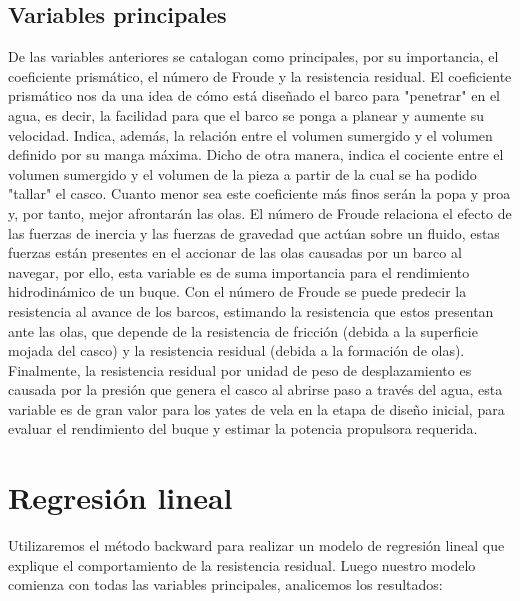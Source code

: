 \documentclass[twoside]{article}
\begin{document}
\begin{multicols}{2}
\subsection{Variables principales}
De las variables anteriores se catalogan como principales, por su importancia, el coeficiente prism\'atico, el n\'umero de Froude y la resistencia residual. El coeficiente prism\'atico nos da una idea de c\'omo est\'a dise\~nado el barco para "penetrar" en el agua, es decir, la facilidad para que el barco se ponga a planear y aumente su velocidad. Indica, adem\'as, la relaci\'on entre el volumen sumergido y el volumen definido por su manga m\'axima. Dicho de otra manera, indica el cociente entre el volumen sumergido y el volumen de la pieza a partir de la cual se ha podido "tallar" el casco. Cuanto menor sea este coeficiente m\'as finos ser\'an la popa y proa y, por tanto, mejor afrontar\'an las olas. El n\'umero de Froude relaciona el efecto de las fuerzas de inercia y las fuerzas de gravedad que act\'uan sobre un fluido, estas fuerzas est\'an presentes en el accionar de las olas causadas por un barco al navegar, por ello, esta variable es de suma importancia para el rendimiento hidrodin\'amico de un buque. Con el n\'umero de Froude se puede predecir la resistencia al avance de los barcos, estimando la resistencia que estos presentan ante las olas, que depende de la resistencia de fricci\'on (debida a la superficie mojada del casco) y la resistencia residual (debida a la formaci\'on de olas). Finalmente, la resistencia residual por unidad de peso de desplazamiento es causada por la presi\'on que genera el casco al abrirse paso a trav\'es del agua, esta variable es de gran valor para los yates de vela en la etapa de dise\~no inicial,  para evaluar el rendimiento del buque y estimar la potencia propulsora requerida.\\





\section{Regresi\'on lineal}
Utilizaremos el m\'etodo backward para realizar un modelo de regresi\'on lineal que explique el comportamiento de la resistencia residual. Luego nuestro modelo comienza con todas las variables principales, analicemos los resultados:\\


\end{multicols}
\end{document}
